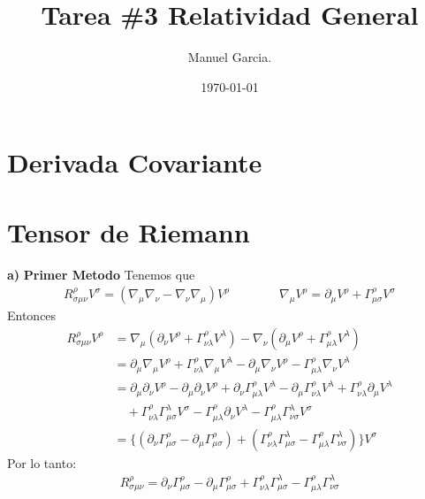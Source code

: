 \documentclass{article}
\title{Tarea \#3 Relatividad General}
\author{Manuel Garcia.}
\date{\today}
\begin{document}
\maketitle

\section{Derivada Covariante}


\section{Tensor de Riemann}
\textbf{a) } \textbf{Primer Metodo} Tenemos que 
\begin{gather*}
  R^\rho_{\sigma\mu\nu} V^\sigma = (\nabla_\mu \nabla_\nu - \nabla_\nu \nabla_\mu) V^\rho \qquad \qquad  \nabla_\mu V^\rho = \partial_\mu V^\rho + \Gamma^\rho_{\mu\sigma} V^\sigma
\end{gather*}
Entonces 
\begin{align*}
  R _{\sigma\mu\nu} ^ {\rho} V ^ {\rho} &= \nabla _{\mu} (\partial_\nu V ^ {\rho} + \Gamma _{\nu\lambda} ^ {\rho} V ^ {\lambda}) - \nabla_\nu(\partial_\mu V ^ {\rho} + \Gamma _{\mu\lambda} ^ {\rho } V ^ {\lambda}) \\
  &= \partial_\mu \nabla_\mu V^\rho + \Gamma _{\nu\lambda} ^ {\rho} \nabla_\mu V^\lambda - \partial_\mu \nabla_\nu V^\rho - \Gamma _{\mu\lambda} ^ {\rho} \nabla_\nu V^\lambda\\
  &= \partial_\mu \partial_\nu V^\rho - \partial_\mu \partial_\nu V^\rho + \partial_\nu \Gamma _{\mu\lambda} ^\rho V^\lambda - \partial_\mu\Gamma _{\nu\lambda} ^\rho V^\lambda + \Gamma _{\nu\lambda} ^\rho \partial_\mu V^\lambda \\
  &\quad + \Gamma _{\nu\lambda} ^\rho \Gamma_{\mu\sigma}^\lambda V^\sigma - \Gamma _{\mu\lambda} ^\rho \partial_\nu V^\lambda - \Gamma _{\mu\lambda } ^\rho \Gamma _{\nu\sigma} ^\lambda V^\sigma \\
  &=\{(\partial_\nu \Gamma _{\mu\sigma} ^\rho - \partial_\mu \Gamma _{\mu\sigma}^\rho) + (\Gamma _{\nu\lambda}^\rho \Gamma _{\mu\sigma}^\lambda - \Gamma _{\mu\lambda}^\rho \Gamma _{\nu\sigma}^\lambda)\}V ^ {\sigma}
\end{align*}
Por lo tanto: 
\begin{gather*}
   R _{\sigma\mu\nu} ^ {\rho} = \partial_\nu \Gamma _{\mu\sigma} ^\rho - \partial_\mu \Gamma _{\mu\sigma}^\rho + \Gamma _{\nu\lambda}^\rho \Gamma _{\mu\sigma}^\lambda - \Gamma _{\mu\lambda}^\rho \Gamma _{\nu\sigma}^\lambda
\end{gather*}
\end{document}
